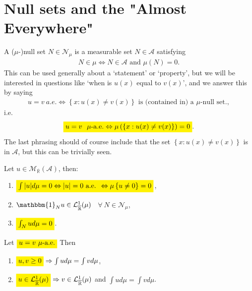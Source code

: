 \section{Null sets and the "Almost Everywhere"}
\begin{definition}
    A (\(\mu\)-)null set \(N\in\mathcal{N}_{\mu}\) is a measurable set \(N\in\mathscr{A}\) satisfying
    \begin{align}
        N\in\mathcal{\mu} \Leftrightarrow N\in\mathscr{A} \text{ and } \mu(N) = 0.
    \end{align}
    This can be used generally about a `statement' or `property', but we will be interested in questions like 
    `when is \(u(x)\) equal to \(v(x)\)', and we answer this by saying
    \begin{align}
        u=v \ a.e. \Leftrightarrow \left\{ x: u(x) \neq v(x) \right\} \text{ is (contained in) a }\mu\text{-null set.}, 
    \end{align}
    i.e.
    \begin{align}
        \highlight[yellow]{u=v \ \  \mu\text{-a.e.} \Leftrightarrow \mu\left( \left\{ x: u(x) \neq v(x) \right\} \right) = 0}.
    \end{align}
    The last phrasing should of course include that the set \( \left\{ x: u(x) \neq v(x) \right\}\) is in \(\mathscr{A}\), but this can be trivially seen.
\end{definition}
\begin{theorem}
    Let \(u\in \mathcal{M}_{\overline{\mathbb{R}}}(\mathscr{A})\), then:
    \begin{enumerate}[label=(\roman*)]
        \item \(\highlight[yellow]{\int\vert u\vert d\mu = 0 \Leftrightarrow \vert u\vert = 0 \text{ a.e. } \Leftrightarrow \mu\left\{u\neq0\right\} = 0}\),
        \item \(\mathbbm{1}_{N}u\in \mathcal{L}^{1}_{\overline{\mathbb{R}}}(\mu)\) \ \(\forall \ N\in\mathcal{N}_{\mu}\),
        \item \(\highlight[yellow]{\int_Nud\mu = 0}\).
    \end{enumerate}
\end{theorem}
\begin{corollary}
    Let \(\highlight[yellow]{u=v \ \mu \text{-a.e.}}\) Then
    \begin{enumerate}[label=(\roman*)]
        \item \(\highlight[yellow]{u,v \geq 0} \Rightarrow \int ud\mu = \int vd\mu\),
        \item \(\highlight[yellow]{u\in\mathcal{L}^{1}_{\overline{\mathbb{R}}}(\mu)} \Rightarrow v\in\mathcal{L}^{1}_{\overline{\mathbb{R}}}(\mu)\) and \(\int ud\mu = \int vd\mu\).
    \end{enumerate}
\end{corollary}
